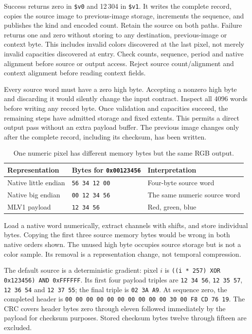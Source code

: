 Success returns zero in \texttt{\$v0} and 12\,304 in \texttt{\$v1}. It writes
the complete record, copies the source image to previous-image storage, increments
the sequence, and publishes the kind and encoded count. Retain the source on both
paths. Failure returns one and zero without storing to any destination,
previous-image or context byte. This includes invalid colors discovered at the
last pixel, not merely invalid capacities discovered at entry. Check counts,
sequence, period and native alignment before source or output access. Reject source
count/alignment and context alignment before reading context fields.

Every source word must have a zero high byte. Accepting a nonzero high byte and
discarding it would silently change the input contract. Inspect all 4096 words
before writing any record byte. Once validation and capacities succeed, the
remaining steps have admitted storage and fixed extents. This permits a direct
output pass without an extra payload buffer. The previous image changes only
after the complete record, including its checksum, has been written.

\begin{table}[htbp]
  \centering
  \caption{One numeric pixel has different memory bytes but the same RGB output.}
  \begin{tabular}{l l l}
    \toprule
    Representation       & Bytes for \texttt{0x00123456} & Interpretation               \\
    \midrule
    Native little endian & \texttt{56 34 12 00}          & Four-byte source word        \\
    Native big endian    & \texttt{00 12 34 56}          & The same numeric source word \\
    MLV1 payload         & \texttt{12 34 56}             & Red, green, blue             \\
    \bottomrule
  \end{tabular}
\end{table}

Load a native word numerically, extract channels with shifts, and store individual
bytes. Copying the first three source memory bytes would be wrong in both native
orders shown. The unused high byte occupies source storage but is not a color
sample. Its removal is a representation change, not temporal compression.

The default source is a deterministic gradient: pixel $i$ is
\texttt{((i * 257) XOR 0x123456) AND 0xFFFFFF}. Its first four payload triples are
\texttt{12 34 56}, \texttt{12 35 57}, \texttt{12 36 54} and \texttt{12 37 55};
the final triple is \texttt{02 3A A9}. At sequence zero, the completed header is
\texttt{00 00 00 00 00 00 00 00 00 00 30 00 F8 CD 76 19}.
The CRC covers header bytes zero through eleven followed immediately by the payload
for checksum purposes. Stored checksum bytes twelve through fifteen are excluded.

